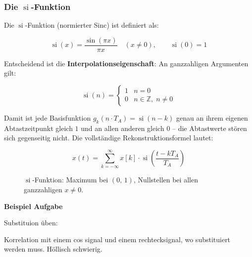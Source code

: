 \subsubsection*{Die \texorpdfstring{$\operatorname{si}$}{si}-Funktion}

Die $\operatorname{si}$-Funktion (normierter Sinc) ist definiert als:

$$
\operatorname{si}(x) = \frac{\sin(\pi x)}{\pi x} \quad (x \neq 0),
\qquad \operatorname{si}(0) = 1
$$

Entscheidend ist die \textbf{Interpolationseigenschaft}: An ganzzahligen Argumenten gilt:

$$
\operatorname{si}(n) =
\begin{cases}
    1 & n = 0 \\
    0 & n \in \mathbb{Z},\; n \neq 0
\end{cases}
$$

Damit ist jede Basisfunktion $g_k(n \cdot T_A) = \operatorname{si}(n - k)$ genau an ihrem
eigenen Abtastzeitpunkt gleich $1$ und an allen anderen gleich $0$ – die Abtastwerte stören
sich gegenseitig nicht. Die vollständige Rekonstruktionsformel lautet:

$$
x(t) = \sum_{k=-\infty}^{\infty} x[k] \cdot \operatorname{si}\!\left(\frac{t - k T_A}{T_A}\right)
$$

\begin{figure}[H]
\centering
{}
\caption{$\operatorname{si}$-Funktion: Maximum bei $(0,\,1)$, Nullstellen bei allen
ganzzahligen $x \neq 0$.}
\end{figure}

\textbf{Beispiel Aufgabe}

Substituion üben:

Korrelation mit einem cos signal und einem rechtecksignal, wo substituiert werden muss.
Höllisch schwierig.

